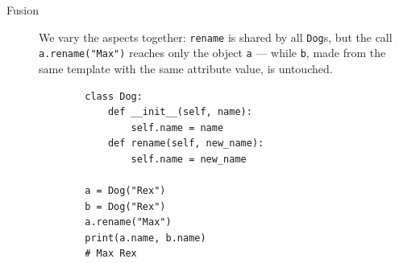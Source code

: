 \begin{description}
  \item[Fusion] We vary the aspects together: \texttt{rename} is
    shared by all \texttt{Dog}s, but the call
    \texttt{a.rename("Max")} reaches only the object
    \texttt{a} --- while \texttt{b}, made from the same
    template with the same attribute value, is untouched.

    \hfill
    \begin{minipage}[t]{0.55\columnwidth}
      \begin{verbatim}
        class Dog:
            def __init__(self, name):
                self.name = name
            def rename(self, new_name):
                self.name = new_name

        a = Dog("Rex")
        b = Dog("Rex")
        a.rename("Max")
        print(a.name, b.name)
        # Max Rex
      \end{verbatim}
    \end{minipage}
\end{description}

